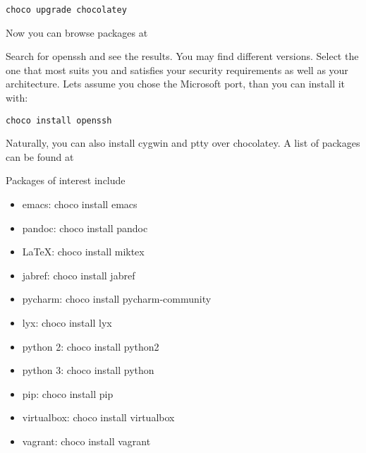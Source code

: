 \begin{verbatim}
choco upgrade chocolatey
\end{verbatim}

Now you can browse packages at


Search for openssh and see the results. You may find different versions.
Select the one that most suits you and satisfies your security
requirements as well as your architecture. Lets assume you chose the
Microsoft port, than you can install it with:

\begin{verbatim}
choco install openssh
\end{verbatim}

Naturally, you can also install cygwin and ptty over chocolatey. A
list of packages can be found at 


Packages of interest include

\begin{itemize}

\item emacs: choco install emacs

\item pandoc: choco install pandoc

\item LaTeX: choco install miktex

\item jabref: choco install jabref

\item pycharm: choco install pycharm-community

\item lyx: choco install lyx

\item python 2: choco install python2

\item python 3: choco install python

\item pip: choco install pip

\item virtualbox: choco install virtualbox

\item vagrant: choco install vagrant

\end{itemize}

